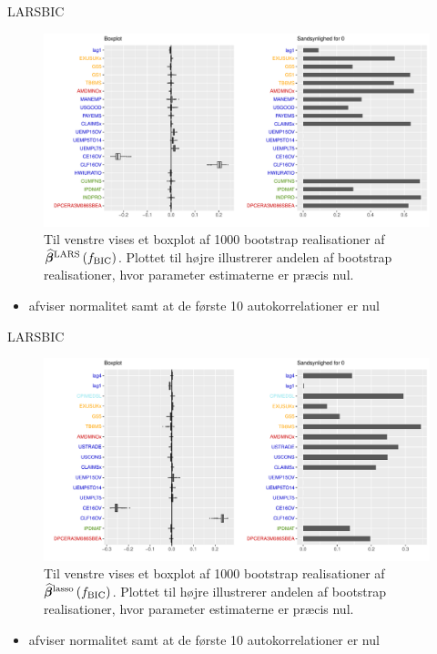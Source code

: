 \begin{frame}{LARS}{BIC}
\begin{figure}
 \includegraphics[width=1\linewidth, height=0.7\textheight]{slides/boxplot_lars_bic.pdf}
 \caption{Til venstre vises et boxplot af 1000 bootstrap realisationer af $\widehat{\boldsymbol{\beta}}^{\text{LARS}} \del{f_\text{BIC}} $.
Plottet til højre illustrerer andelen af bootstrap realisationer, hvor parameter estimaterne er præcis nul.}
 \end{figure}
 \begin{itemize}
\item afviser normalitet samt at de første 10 autokorrelationer er nul
\end{itemize}
\end{frame}


\begin{frame}{LARS}{BIC}
\begin{figure}
 \includegraphics[width=1\linewidth, height=0.7\textheight]{slides/boxplot_lars_lasso_bic.pdf}
 \caption{Til venstre vises et boxplot af 1000 bootstrap realisationer af $\widehat{\boldsymbol{\beta}}^{\text{lasso}} \del{f_\text{BIC}} $.
Plottet til højre illustrerer andelen af bootstrap realisationer, hvor parameter estimaterne er præcis nul. }
 \end{figure}
 \begin{itemize}
\item afviser normalitet samt at de første 10 autokorrelationer er nul
\end{itemize}
\end{frame}

